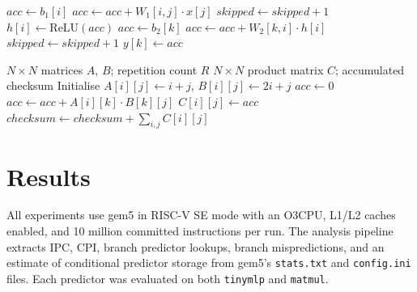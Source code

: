\documentclass[conference]{IEEEtran}
\begin{document}
\begin{algorithm}[t]
\caption{\texttt{tinymlp} control-flow skeleton}
\label{alg:tinymlp}
\footnotesize
\begin{algorithmic}[1]
        \State $acc \gets b_1[i]$
                \State $acc \gets acc + W_1[i,j] \cdot x[j]$
            \Else
                \State $skipped \gets skipped + 1$
            \EndIf
        \EndFor
        \State $h[i] \gets \mathrm{ReLU}(acc)$
    \EndFor
        \State $acc \gets b_2[k]$
                \State $acc \gets acc + W_2[k,i] \cdot h[i]$
            \Else
                \State $skipped \gets skipped + 1$
            \EndIf
        \EndFor
        \State $y[k] \gets acc$
    \EndFor
\EndFor
\end{algorithmic}
\end{algorithm}

\begin{algorithm}[t]
\caption{\texttt{matmul} control-flow skeleton}
\label{alg:matmul}
\footnotesize
\begin{algorithmic}[1]
\Require $N \times N$ matrices $A$, $B$; repetition count $R$
\Ensure $N \times N$ product matrix $C$; accumulated checksum
\State Initialise $A[i][j] \gets i+j$, $B[i][j] \gets 2i+j$
            \State $acc \gets 0$
                \State $acc \gets acc + A[i][k] \cdot B[k][j]$
            \EndFor
            \State $C[i][j] \gets acc$
        \EndFor
    \EndFor
    \State $checksum \gets checksum + \sum_{i,j} C[i][j]$
\EndFor
\end{algorithmic}
\end{algorithm}

\section{Results}

All experiments use gem5 in RISC-V SE mode with an O3CPU, L1/L2 caches enabled, and 10 million committed instructions per run. The analysis pipeline extracts IPC, CPI, branch predictor lookups, branch mispredictions, and an estimate of conditional predictor storage from gem5's \texttt{stats.txt} and \texttt{config.ini} files. Each predictor was evaluated on both \texttt{tinymlp} and \texttt{matmul}.
\end{document}

